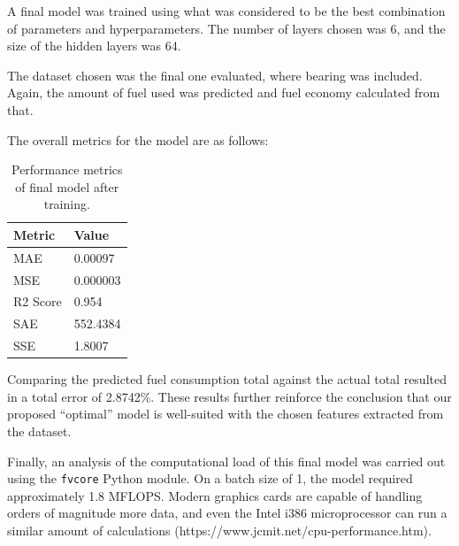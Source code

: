 \documentclass[letterpaper]{article}
\begin{document}
A final model was trained using what was considered to be the best 
combination of parameters and hyperparameters. The number of layers chosen 
was 6, and the size of the hidden layers was 64.

The dataset chosen was the final one evaluated, where bearing was 
included. Again, the amount of fuel used was predicted and fuel economy 
calculated from that.

The overall metrics for the model are as follows:

\begin{table}[h!]
    \begin{tabular}{|l|l|}
        \hline
        Metric & Value \\
        \hline
        MAE          	& 0.00097	\\
        MSE          	& 0.000003   \\
        R2 Score     	& 0.954  	\\
        SAE          	& 552.4384   \\
        SSE          	& 1.8007 \\
        \hline
    \end{tabular}
    \caption{Performance metrics of final model after training.}
    \label{tab:my-table}
\end{table}

Comparing the predicted fuel consumption total against the actual total 
resulted in a total error of 2.8742\%. These results further reinforce the 
conclusion that our proposed ``optimal'' model is well-suited with the 
chosen features extracted from the dataset.

Finally, an analysis of the computational load of this final model was 
carried out using the \verb|fvcore| Python module. On a batch size of 1, 
the model required approximately 1.8 MFLOPS. Modern graphics cards are 
capable of handling orders of magnitude more data, and even the Intel 
i386 microprocessor can run a similar amount of calculations 
(https://www.jcmit.net/cpu-performance.htm).
\end{document}
